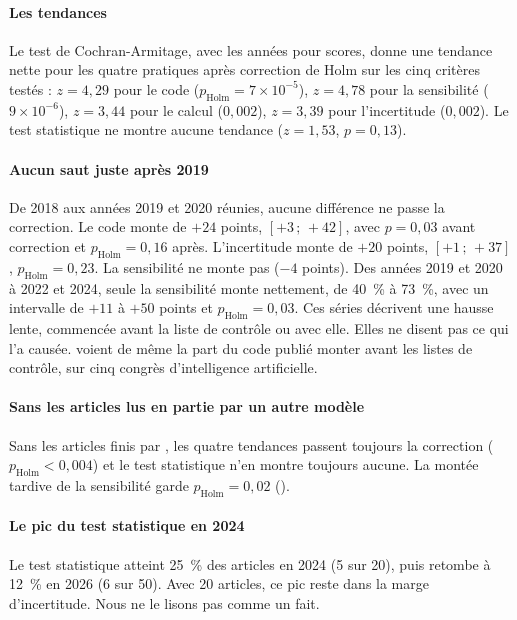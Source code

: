 \paragraph{Les tendances}
Le test de Cochran-Armitage, avec les années pour scores, donne une tendance nette pour les quatre
pratiques après correction de Holm sur les cinq critères testés : $z = 4{,}29$ pour le code
($p_{\text{Holm}} = 7 \times 10^{-5}$), $z = 4{,}78$ pour la sensibilité ($9 \times 10^{-6}$),
$z = 3{,}44$ pour le calcul ($0{,}002$), $z = 3{,}39$ pour l'incertitude ($0{,}002$). Le test
statistique ne montre aucune tendance ($z = 1{,}53$, $p = 0{,}13$).

\paragraph{Aucun saut juste après 2019}
De 2018 aux années 2019 et 2020 réunies, aucune différence ne passe la correction. Le code monte de $+24$ points, $[+3\,;\,+42]$,
avec $p = 0{,}03$ avant correction et $p_{\text{Holm}} = 0{,}16$ après. L'incertitude monte de $+20$
points, $[+1\,;\,+37]$, $p_{\text{Holm}} = 0{,}23$. La sensibilité ne monte pas ($-4$ points). Des
années 2019 et 2020 à 2022 et 2024, seule la sensibilité monte nettement, de 40~\% à 73~\%, avec un intervalle de
$+11$ à $+50$ points et $p_{\text{Holm}} = 0{,}03$. Ces séries décrivent une hausse lente, commencée avant
la liste de contrôle ou avec elle. Elles ne disent pas ce qui l'a causée. \textcite{coakley2026shift}
voient de même la part du code publié monter avant les listes de contrôle, sur cinq congrès
d'intelligence artificielle.

\paragraph{Sans les articles lus en partie par un autre modèle}
Sans les articles finis par , les quatre tendances passent toujours la correction
($p_{\text{Holm}} < 0{,}004$) et le test statistique n'en montre toujours aucune. La montée tardive de
la sensibilité garde $p_{\text{Holm}} = 0{,}02$ ().

\paragraph{Le pic du test statistique en 2024}
Le test statistique atteint 25~\% des articles en 2024 (5 sur 20), puis retombe à 12~\% en 2026 (6 sur
50). Avec 20 articles, ce pic reste dans la marge d'incertitude. Nous ne le lisons pas comme un fait.

